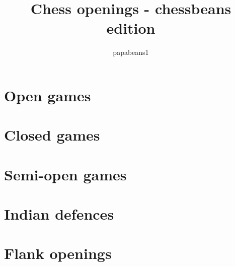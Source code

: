 \documentclass[a4paper,8pt]{extarticle}
\begin{document}
\author{papabeans1}
\title{Chess openings - chessbeans edition}
\section{Open games}

\section{Closed games}

\section{Semi-open games}

\section{Indian defences}

\section{Flank openings}

\end{document}
